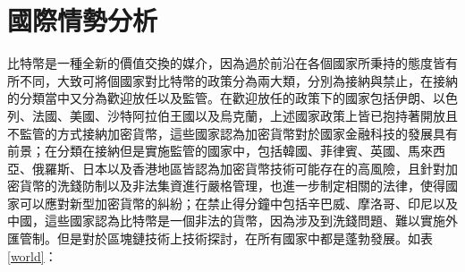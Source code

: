 	\section{國際情勢分析}
	比特幣是一種全新的價值交換的媒介，因為過於前沿在各個國家所秉持的態度皆有所不同，大致可將個國家對比特幣的政策分為兩大類，分別為接納與禁止，在接納的分類當中又分為歡迎放任以及監管。在歡迎放任的政策下的國家包括伊朗、以色列、法國、美國、沙特阿拉伯王國以及烏克蘭，上述國家政策上皆已抱持著開放且不監管的方式接納加密貨幣，這些國家認為加密貨幣對於國家金融科技的發展具有前景；在分類在接納但是實施監管的國家中，包括韓國、菲律賓、英國、馬來西亞、俄羅斯、日本以及香港地區皆認為加密貨幣技術可能存在的高風險，且針對加密貨幣的洗錢防制以及非法集資進行嚴格管理，也進一步制定相關的法律，使得國家可以應對新型加密貨幣的糾紛；在禁止得分鐘中包括辛巴威、摩洛哥、印尼以及中國，這些國家認為比特幣是一個非法的貨幣，因為涉及到洗錢問題、難以實施外匯管制。但是對於區塊鏈技術上技術探討，在所有國家中都是蓬勃發展。如表\ref{world}：

